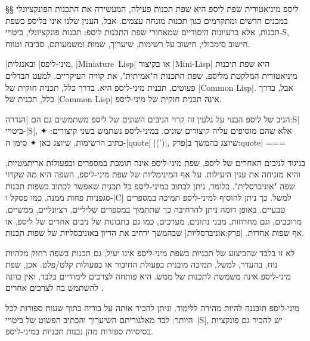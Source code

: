 §§ ליספ מיניאטורית
שפת ליספ היא שפת תכנות פעילה, המעשירה את התכנות הפונקציונלי במבנים חדשים
ומתקדמים כגון תכנות מונחה עצמים. אבל, הענין שלנו אינו בליספ כשפת תכנות, אלא
ברעיונות היסודיים שמאחורי שפת התכנות ליספ: תכנות פונקציונלי, ביטויי-S, חישוב
סימבולי, חישוב על רשימות, שיערוך, שמות ומשמעותם, סביבה וטווח.

\ע|מיני-ליפס| ובאנגלית, \E|Miniature~Lisp| או בקיצור \E|Mini-Lisp| היא שפת
תיכנות מיניאטורית המלקטת מליספ, שפת התכנות ה"אמיתית", את קוויה העיקריים. למעט
הבדלים פעוטים, תכנית מיני-ליספ היא, בדרך כלל, תכנית חוקית של \E|Common Lisp|.
אבל, בדרך כלל, תכנית של \E|Common Lisp| אינה תכנית חוקית של מיני-ליספ.

 הניב של ליספ הבנוי על גלעין זה קרוי הניבים השונים של ליספ משתמשים גם הם
 |הגדרה:S| ביטויי-\E|S|, אלא שהם מוסיפים עליה קיצורים שונים. במיני-ליספ
נשתמש בשני קיצורים:
✦ כתיב הרשימות, שיוצג כאן
✦ סימן ה-\E|quote| \E|(')|, שיוצג בהמשך ב|פרק:quote|
===

בניגוד לניבים האחרים של ליספ, שפת מיני-ליספ אינה תומכת במספרים ובפעולות
אריתמטיות, והיא מזניחה את ענין היעילות. על אף המינימליות של שפת מיני-ליספ,
השפה היא מה שקרוי שפה "אוניברסלית". כלומר, ניתן לכתוב במיני-ליספ כל תכנית שאפשר
לכתוב בשפות תכנות סגפניות פחות ממנה, כמו פסקל ו-\E|C| למשל. כך ניתן להוסיף
למיני-ליספ תמיכה במספרים טבעיים. באופן דומה ניתן להרחיבה כך שתתמוך במספרים
שליליים, רציונליים, ממשיים, מרוכבים, וגם מחרוזות, מבני נתונים, מערכים, כמו גם
בתכונות של ניבים אחרים של ליספ, או אף שפות אחרות. |פרק:אוניברסליות| שבהמשך
ירחיב את הדיון באוניבסליות של שפות תכנות.

לא זו בלבד שהביצוע של תכניות בשפת מיני-ליספ אינו יעיל, גם תכנות בשפה רחוק
מלהיות נוח, בהעדר, למשל, תמיכה מובנית בפעולת החיבור או בפעולות קלט/פלט. אכן,
שפת מיני-ליספ אינה משמשת לתכנות של ממש. היא פותחה לצרכים לימודיים בלבד, ואין
כוונה להשתמש בה לצרכים אחרים .

מיני-ליספ תוכננה להיות מהירה ללימוד. וניתן להכיר אותה על בוריה בתוך שעות ספורות
לכל היותר: לבד מאלגוריתם השיערוך והכתיב הפשוט של ביטויי~\E|S|, יש להכיר
גם פונקציות בסיסיות ספורות מהן נבנות תכניות במיני-ליספ.


